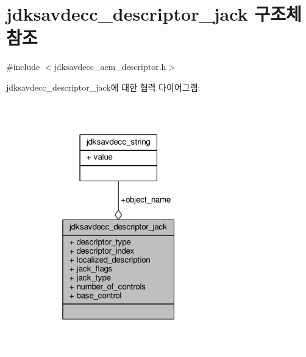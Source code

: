 \hypertarget{structjdksavdecc__descriptor__jack}{}\section{jdksavdecc\+\_\+descriptor\+\_\+jack 구조체 참조}
\label{structjdksavdecc__descriptor__jack}


{\ttfamily \#include $<$jdksavdecc\+\_\+aem\+\_\+descriptor.\+h$>$}



jdksavdecc\+\_\+descriptor\+\_\+jack에 대한 협력 다이어그램\+:
\nopagebreak
\begin{figure}[H]
\begin{center}
\leavevmode
\includegraphics[width=217pt]{structjdksavdecc__descriptor__jack__coll__graph}
\end{center}
\end{figure}
